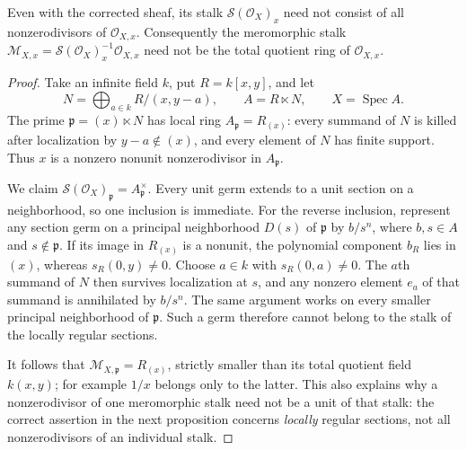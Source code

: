\begin{example}\label{SA23-D-13}
Even with the corrected sheaf, its stalk
$\mathscr S(\mathcal O_X)_x$ need not consist of all
nonzerodivisors of $\mathcal O_{X,x}$.  Consequently
the meromorphic stalk
$\mathcal M_{X,x}=\mathscr S(\mathcal O_X)_x^{-1}
\mathcal O_{X,x}$ need not be the total quotient ring of
$\mathcal O_{X,x}$.
\end{example}
\begin{proof}
Take an infinite field $k$, put $R=k[x,y]$, and let
\[
 N=\bigoplus_{a\in k}R/(x,y-a),\qquad
 A=R\ltimes N,\qquad X=\operatorname{Spec}A.
\]
The prime $\mathfrak p=(x)\ltimes N$ has local ring
$A_{\mathfrak p}=R_{(x)}$: every summand of $N$ is killed
after localization by $y-a\notin(x)$, and every element of
$N$ has finite support.  Thus $x$ is a nonzero nonunit
nonzerodivisor in $A_{\mathfrak p}$.

We claim
$\mathscr S(\mathcal O_X)_{\mathfrak p}
=A_{\mathfrak p}^{\times}$.
Every unit germ extends to a unit section on a neighborhood,
so one inclusion is immediate.  For the reverse inclusion,
represent any section germ on a principal neighborhood
$D(s)$ of $\mathfrak p$ by $b/s^n$, where
$b,s\in A$ and $s\notin\mathfrak p$.
If its image in $R_{(x)}$ is a nonunit, the polynomial
component $b_R$ lies in $(x)$, whereas
$s_R(0,y)\ne0$.  Choose $a\in k$ with
$s_R(0,a)\ne0$.  The $a$th summand of $N$ then survives
localization at $s$, and any nonzero element $e_a$ of that
summand is annihilated by $b/s^n$.
The same argument works on every smaller principal
neighborhood of $\mathfrak p$.  Such a germ therefore cannot
belong to the stalk of the locally regular sections.

It follows that
$\mathcal M_{X,\mathfrak p}=R_{(x)}$, strictly smaller than
its total quotient field $k(x,y)$; for example $1/x$ belongs
only to the latter.  This also explains why a nonzerodivisor
of one meromorphic stalk need not be a unit of that stalk:
the correct assertion in the next proposition concerns
\emph{locally} regular sections, not all nonzerodivisors
of an individual stalk.
\end{proof}

